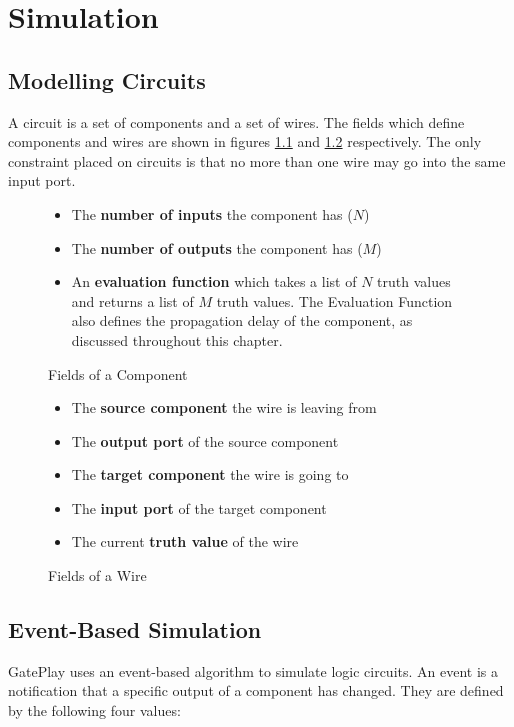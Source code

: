 \chapter{Simulation}
\section{Modelling Circuits}
A circuit is a set of components and a set of wires. The fields which define components and wires are shown in figures \ref{fig:component} and \ref{fig:wire} respectively. The only constraint placed on circuits is that no more than one wire may go into the same input port.

\begin{figure}[H]
\centering
\begin{itemize}
	\item The \textbf{number of inputs} the component has ($N$)
	\item The \textbf{number of outputs} the component has ($M$)
	\item An \textbf{evaluation function} which takes a list of $N$ truth values and returns a list  of $M$ truth values. The Evaluation Function also defines the propagation delay of the component, as discussed throughout this chapter.
\end{itemize}
\label{fig:component}
\caption{Fields of a Component}
\end{figure}

\begin{figure}[H]
\centering
\begin{itemize}
	\item The \textbf{source component} the wire is leaving from
	\item The \textbf{output port} of the source component
	\item The \textbf{target component} the wire is going to
	\item The \textbf{input port} of the target component
	\item The current \textbf{truth value} of the wire 
\end{itemize}
\label{fig:wire}
\caption{Fields of a Wire}
\end{figure}

\section{Event-Based Simulation}
GatePlay uses an event-based algorithm to simulate logic circuits. An event is a notification that a specific output of a component has changed. They are defined by the following four values:

